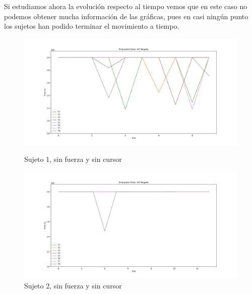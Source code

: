 \documentclass[a4paper,11pt, oneside]{book}
\begin{document}
Si estudiamos ahora la evolución respecto al tiempo vemos que en este caso no podemos obtener mucha información de las gráficas, pues en casi ningún punto los sujetos han podido terminar el movimiento a tiempo.

\begin{figure}[H]
	\begin{minipage}[b]{0.5\linewidth}
		\centering
		\includegraphics[width=\linewidth]{sujeto1/no_force_no_cursor/evolution_time}
		\caption{Sujeto 1, sin fuerza y sin cursor}
		\label{fig:figura1}
	\end{minipage}
	\hspace{0.5cm}
	\begin{minipage}[b]{0.5\linewidth}
		\centering
		\includegraphics[width=\linewidth]{sujeto2/no_force_no_cursor/evolution_time}
		\caption{Sujeto 2, sin fuerza y sin cursor}
		\label{fig:figura2}
	\end{minipage}
\end{figure}
\end{document}
